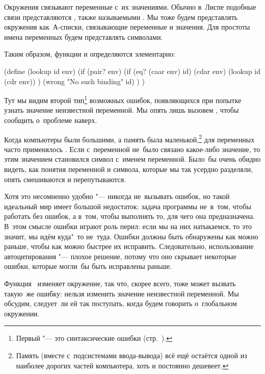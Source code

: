 Окружения связывают переменные с~их значениями. Обычно в~Лиспе подобные связи
представляются , также называемыми
. Мы тоже будем представлять окружения как~А-списки,
связывающие переменные и значения. Для простоты имена переменных будем
представлять символами.

Таким образом, функции  и  определяются элементарно:


\begin{code:lisp}
(define (lookup id env)
  (if (pair? env)
      (if (eq? (caar env) id)
          (cdar env)
          (lookup id (cdr env)) )
      (wrong "No such binding" id) ) )
\end{code:lisp}

Тут мы видим второй тип\footnote{Первый "--- это синтаксические ошибки
(стр.~\pageref{basic/atoms/para:the-first-error}).} возможных ошибок,
появляющихся при попытке узнать значение неизвестной переменной. Мы опять лишь
вызовем , чтобы сообщить о~проблеме наверх.

Когда компьютеры были большими, а память была маленькой,\footnote*{Память
(вместе с~подсистемами ввода-вывода) всё ещё остаётся одной из наиболее дорогих
частей компьютера, хоть и постоянно дешевеет.} для переменных часто применялось
. Если с~переменной не~было связано какое-либо значение,
то этим значением становился символ с~именем переменной. Было~бы очень обидно
видеть, как понятия переменной и символа, которые мы так усердно разделяли,
опять смешиваются и перепутываются.

Хотя это несомненно удобно "--- никогда не~вызывать ошибок, но такой идеальный
мир имеет большой недостаток: задача программы не~в~том, чтобы работать без
ошибок, а в~том, чтобы выполнять то, для чего она предназначена. В~этом смысле
ошибки играют роль перил: если мы на них натыкаемся, то это значит, мы идём
куда"~то не~туда. Ошибки должны быть обнаружены как можно раньше, чтобы как
можно быстрее их исправить. Следовательно, использование автоцитирования "---
плохое решение, потому что оно скрывает некоторые ошибки, которые могли~бы быть
исправлены раньше.

Функция~ изменяет окружение, так что, скорее всего, тоже может
вызвать такую~же ошибку: нельзя изменить значение неизвестной переменной. Мы
обсудим, следует~ли ей так поступать, когда будем говорить о~глобальном
окружении.

